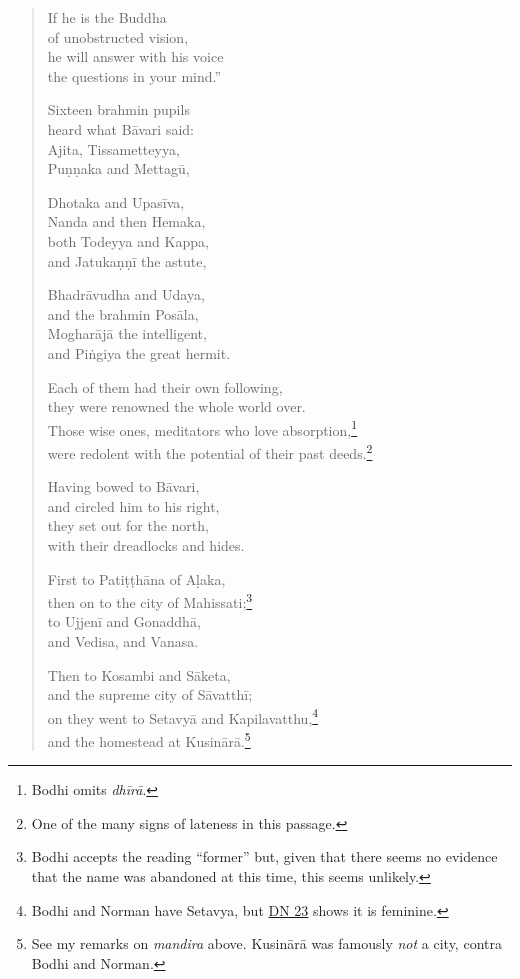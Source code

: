 \documentclass[12pt,openany]{book}%
\begin{document}
\begin{verse}
If he is the Buddha \\
of unobstructed vision, \\
he will answer with his voice \\
the questions in your mind.” 

Sixteen brahmin pupils \\
heard what \textsanskrit{Bāvari} said: \\
Ajita, Tissametteyya, \\
\textsanskrit{Puṇṇaka} and \textsanskrit{Mettagū}, 

Dhotaka and \textsanskrit{Upasīva}, \\
Nanda and then Hemaka, \\
both Todeyya and Kappa, \\
and \textsanskrit{Jatukaṇṇī} the astute, 

\textsanskrit{Bhadrāvudha} and Udaya, \\
and the brahmin \textsanskrit{Posāla}, \\
\textsanskrit{Mogharājā} the intelligent, \\
and \textsanskrit{Piṅgiya} the great hermit. 

Each of them had their own following, \\
they were renowned the whole world over. \\
Those wise ones, meditators who love absorption,\footnote{Bodhi omits \textit{\textsanskrit{dhīrā}}. } \\
were redolent with the potential of their past deeds.\footnote{One of the many signs of lateness in this passage. } 

Having bowed to \textsanskrit{Bāvari}, \\
and circled him to his right, \\
they set out for the north, \\
with their dreadlocks and hides. 

First to \textsanskrit{Patiṭṭhāna} of \textsanskrit{Aḷaka}, \\
then on to the city of Mahissati;\footnote{Bodhi accepts the reading “former” but, given that there seems no evidence that the name was abandoned at this time, this seems unlikely. } \\
to \textsanskrit{Ujjenī} and \textsanskrit{Gonaddhā}, \\
and Vedisa, and Vanasa. 

Then to Kosambi and \textsanskrit{Sāketa}, \\
and the supreme city of \textsanskrit{Sāvatthī}; \\
on they went to \textsanskrit{Setavyā} and Kapilavatthu,\footnote{Bodhi and Norman have Setavya, but \href{https://suttacentral.net/dn23/en/sujato}{DN 23} shows it is feminine. } \\
and the homestead at \textsanskrit{Kusinārā}.\footnote{See my remarks on \textit{mandira} above. \textsanskrit{Kusinārā} was famously \emph{not} a city, contra Bodhi and Norman. } 


\end{verse}
\end{document}
